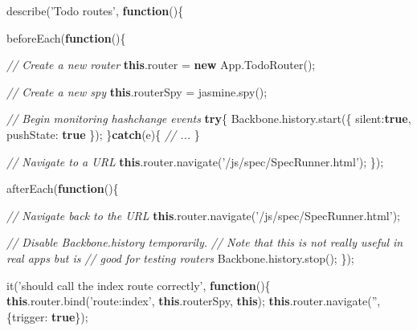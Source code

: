 \documentclass[9pt]{book}
\newenvironment{Shaded}{}{}
\newcommand{\KeywordTok}[1]{\textcolor[rgb]{0.00,0.44,0.13}{\textbf{{#1}}}}
\newcommand{\DataTypeTok}[1]{\textcolor[rgb]{0.56,0.13,0.00}{{#1}}}
\newcommand{\StringTok}[1]{\textcolor[rgb]{0.25,0.44,0.63}{{#1}}}
\newcommand{\CommentTok}[1]{\textcolor[rgb]{0.38,0.63,0.69}{\textit{{#1}}}}
\newcommand{\OtherTok}[1]{\textcolor[rgb]{0.00,0.44,0.13}{{#1}}}
\newcommand{\FunctionTok}[1]{\textcolor[rgb]{0.02,0.16,0.49}{{#1}}}
\newcommand{\NormalTok}[1]{{#1}}
\begin{document}
\begin{Shaded}
\begin{Highlighting}[]
\FunctionTok{describe}\NormalTok{(}\StringTok{'Todo routes'}\NormalTok{, }\KeywordTok{function}\NormalTok{()\{}

   \FunctionTok{beforeEach}\NormalTok{(}\KeywordTok{function}\NormalTok{()\{}

        \CommentTok{// Create a new router}
        \KeywordTok{this}\NormalTok{.}\FunctionTok{router} \NormalTok{= }\KeywordTok{new} \OtherTok{App}\NormalTok{.}\FunctionTok{TodoRouter}\NormalTok{();}

        \CommentTok{// Create a new spy}
        \KeywordTok{this}\NormalTok{.}\FunctionTok{routerSpy} \NormalTok{= }\OtherTok{jasmine}\NormalTok{.}\FunctionTok{spy}\NormalTok{();}

        \CommentTok{// Begin monitoring hashchange events}
        \KeywordTok{try}\NormalTok{\{}
            \OtherTok{Backbone}\NormalTok{.}\OtherTok{history}\NormalTok{.}\FunctionTok{start}\NormalTok{(\{}
                \DataTypeTok{silent}\NormalTok{:}\KeywordTok{true}\NormalTok{,}
                \DataTypeTok{pushState}\NormalTok{: }\KeywordTok{true}
            \NormalTok{\});}
        \NormalTok{\}}\KeywordTok{catch}\NormalTok{(e)\{}
           \CommentTok{// ...}
        \NormalTok{\}}

        \CommentTok{// Navigate to a URL}
        \KeywordTok{this}\NormalTok{.}\OtherTok{router}\NormalTok{.}\FunctionTok{navigate}\NormalTok{(}\StringTok{'/js/spec/SpecRunner.html'}\NormalTok{);}
   \NormalTok{\}); }

   \FunctionTok{afterEach}\NormalTok{(}\KeywordTok{function}\NormalTok{()\{}

        \CommentTok{// Navigate back to the URL}
        \KeywordTok{this}\NormalTok{.}\OtherTok{router}\NormalTok{.}\FunctionTok{navigate}\NormalTok{(}\StringTok{'/js/spec/SpecRunner.html'}\NormalTok{);}

        \CommentTok{// Disable Backbone.history temporarily.}
        \CommentTok{// Note that this is not really useful in real apps but is}
        \CommentTok{// good for testing routers}
        \OtherTok{Backbone}\NormalTok{.}\OtherTok{history}\NormalTok{.}\FunctionTok{stop}\NormalTok{();}
   \NormalTok{\});}

   \FunctionTok{it}\NormalTok{(}\StringTok{'should call the index route correctly'}\NormalTok{, }\KeywordTok{function}\NormalTok{()\{}
        \KeywordTok{this}\NormalTok{.}\OtherTok{router}\NormalTok{.}\FunctionTok{bind}\NormalTok{(}\StringTok{'route:index'}\NormalTok{, }\KeywordTok{this}\NormalTok{.}\FunctionTok{routerSpy}\NormalTok{, }\KeywordTok{this}\NormalTok{);}
        \KeywordTok{this}\NormalTok{.}\OtherTok{router}\NormalTok{.}\FunctionTok{navigate}\NormalTok{(}\StringTok{''}\NormalTok{, \{}\DataTypeTok{trigger}\NormalTok{: }\KeywordTok{true}\NormalTok{\});}


\end{Highlighting}
\end{Shaded}
\end{document}
